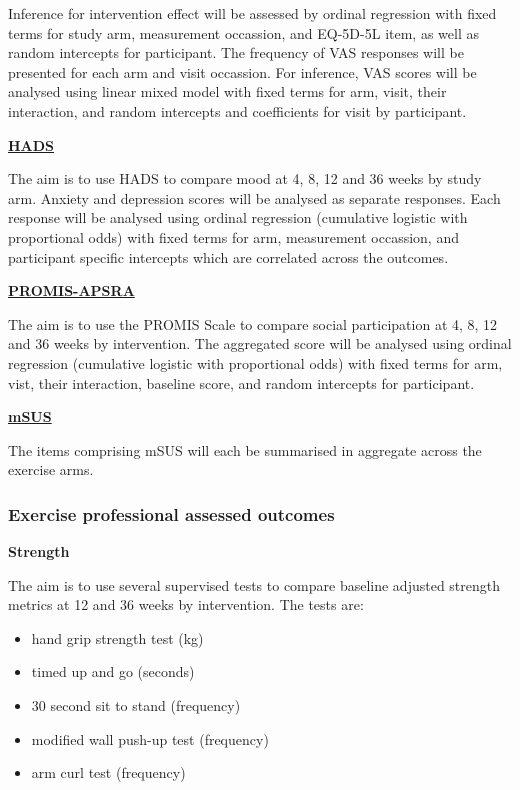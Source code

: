 \documentclass[11pt,parskip=half-]{scrartcl}
\providecommand{\tightlist}{%
  \setlength{\itemsep}{0pt}\setlength{\parskip}{0pt}}
\begin{document}
Inference for intervention effect will be assessed by ordinal regression with fixed terms for study arm, measurement occassion, and EQ-5D-5L item, as well as random intercepts for participant. The frequency of VAS responses will be presented for each arm and visit occassion. For inference, VAS scores will be analysed using linear mixed model with fixed terms for arm, visit, their interaction, and random intercepts and coefficients for visit by participant.

\label{analysis:hads}
\hyperref[outcome:hads]{\textbf{HADS}}

The aim is to use HADS to compare mood at 4, 8, 12 and 36 weeks by study arm. Anxiety and depression scores will be analysed as separate responses. Each response will be analysed using ordinal regression (cumulative logistic with proportional odds) with fixed terms for arm, measurement occassion, and participant specific intercepts which are correlated across the outcomes.

\label{analysis:promis-aspra}
\hyperref[outcome:promis-apsra]{\textbf{PROMIS-APSRA}}

The aim is to use the PROMIS Scale to compare social participation at 4, 8, 12 and 36 weeks by intervention. The aggregated score will be analysed using ordinal regression (cumulative logistic with proportional odds)  with fixed terms for arm, vist, their interaction, baseline score, and random intercepts for participant.

\label{analysis:msus}
\hyperref[outcome:msus]{\textbf{mSUS}}

The items comprising mSUS will each be summarised in aggregate across the exercise arms.

\subsubsection{Exercise professional assessed outcomes}\label{exercise-professional-assessed-outcomes}

\textbf{Strength}

The aim is to use several supervised tests to compare baseline adjusted strength metrics at 12 and 36 weeks by intervention. The tests are:

\begin{itemize}
  \tightlist
  \item hand grip strength test (kg)
  \item timed up and go (seconds)
  \item 30 second sit to stand (frequency)
  \item modified wall push-up test (frequency)
  \item arm curl test (frequency)

\end{itemize}
\end{document}
